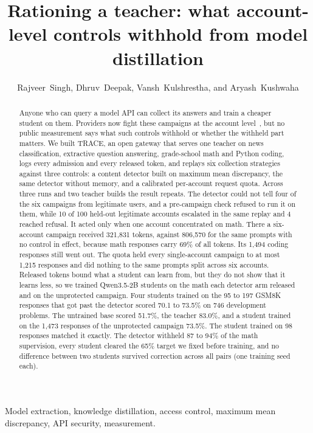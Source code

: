 \documentclass[journal]{IEEEtran}
\title{Rationing a teacher: what account-level controls withhold from model distillation}
\author{Rajveer~Singh, Dhruv~Deepak, Vansh~Kulshrestha, and Aryash~Kushwaha}
\begin{document}
\maketitle

\begin{abstract}
Anyone who can query a model API can collect its answers and train a cheaper student on them. Providers now fight these campaigns at the account level~\cite{anthropic2026detecting,openai2026disrupting}, but no public measurement says what such controls withhold or whether the withheld part matters. We built TRACE, an open gateway that serves one teacher on news classification, extractive question answering, grade-school math and Python coding, logs every admission and every released token, and replays six collection strategies against three controls: a content detector built on maximum mean discrepancy, the same detector without memory, and a calibrated per-account request quota. Across three runs and two teacher builds the result repeats. The detector could not tell four of the six campaigns from legitimate users, and a pre-campaign check refused to run it on them, while 10 of 100 held-out legitimate accounts escalated in the same replay and 4 reached refusal. It acted only when one account concentrated on math. There a six-account campaign received 321,831 tokens, against 806,570 for the same prompts with no control in effect, because math responses carry 69\% of all tokens. Its 1,494 coding responses still went out. The quota held every single-account campaign to at most 1,215 responses and did nothing to the same prompts split across six accounts. Released tokens bound what a student can learn from, but they do not show that it learns less, so we trained Qwen3.5-2B students on the math each detector arm released and on the unprotected campaign. Four students trained on the 95 to 197 GSM8K responses that got past the detector scored 70.1 to 73.5\% on 746 development problems. The untrained base scored 51.7\%, the teacher 83.0\%, and a student trained on the 1,473 responses of the unprotected campaign 73.5\%. The student trained on 98 responses matched it exactly. The detector withheld 87 to 94\% of the math supervision, every student cleared the 65\% target we fixed before training, and no difference between two students survived correction across all pairs (one training seed each).
\end{abstract}
\begin{IEEEkeywords}
Model extraction, knowledge distillation, access control, maximum mean discrepancy, API security, measurement.
\end{IEEEkeywords}
\end{document}
